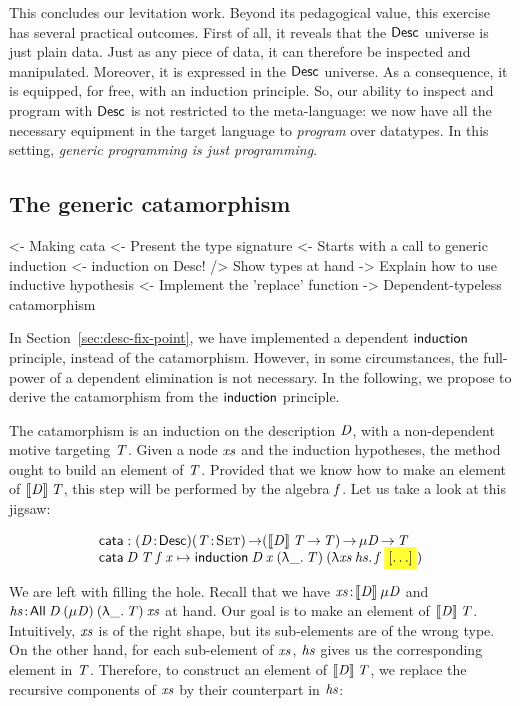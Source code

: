 This concludes our levitation work. Beyond its pedagogical value, this
exercise has several practical outcomes. First of all, it reveals that
the $\Desc$ universe is just plain data. Just as any piece of data, it
can therefore be inspected and manipulated. Moreover, it is expressed
in the $\Desc$ universe. As a consequence, it is equipped, for free,
with an induction principle. So, our ability to inspect and program
with $\Desc$ is not restricted to the meta-language: we now have all
the necessary equipment in the target language to \emph{program} over
datatypes. In this setting, \emph{generic programming is just 
  programming}.


\subsection{The generic catamorphism}

\begin{wstructure}
<- Making cata
    <- Present the type signature
    <- Starts with a call to generic induction
        <- induction on Desc!
        /> Show types at hand
        -> Explain how to use inductive hypothesis
    <- Implement the 'replace' function
    -> Dependent-typeless catamorphism 
\end{wstructure}

In Section~\ref{sec:desc-fix-point}, we have implemented a dependent
$\F{induction}$ principle, instead of the catamorphism. However, in
some circumstances, the full-power of a dependent elimination is not
necessary. In the following, we propose to derive the catamorphism
from the $\F{induction}$ principle.

The catamorphism is an induction on the description $\V{D}$, with a
non-dependent motive targeting $\V{T}$. Given a node $\V{xs}$ and the
induction hypotheses, the method ought to build an element of
$\V{T}$. Provided that we know how to make an element of
$\descop{\V{D}}{\V{T}}$, this step will be performed by the algebra
$\V{f}$. Let us take a look at this jigsaw:

\newcommand{\cata}{\F{cata}}

\[\stk{
\cata : \PITEL{\V{D}}{\Desc}
           \PI{\V{T}}{\Set}
           (\descop{\V{D}}{\V{T}} \To \V{T}) \To 
           \Mu{\V{D}} \To \V{T} \\
\cata\: \V{D}\: \V{T}\: \V{f\: \V{x}} \mapsto
  \F{induction}\: \V{D}\:\V{x}\: (\LAM{\_}\V{T})\: (\LAM{\V{xs}\:\V{hs}} \V{f}\: \SHED)
}\]

We are left with filling the hole. Recall that we have
\(\Bhab{\V{xs}}{\descop{\V{D}}{\Mu{\V{D}}}}\) and
\(\Bhab{\V{hs}}{\All{\V{D}}{(\Mu{\V{D}})}{(\LAM{\_} \V{T})}{\V{xs}}}\)
at hand. Our goal is to make an element of
\(\descop{\V{D}}{\V{T}}\). Intuitively, $\V{xs}$ is of the right
shape, but its sub-elements are of the wrong type. On the other hand,
for each sub-element of $\V{xs}$, $\V{hs}$ gives us the corresponding
element in $\V{T}$.  Therefore, to construct an element of
\(\descop{\V{D}}{\V{T}}\), we replace the recursive components of
\(\V{xs}\) by their counterpart in \(\V{hs}\):

